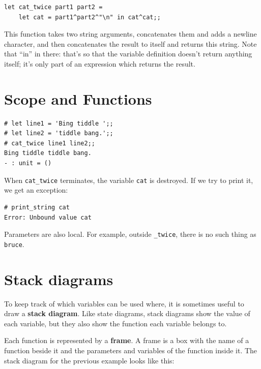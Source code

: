 \documentclass[10pt]{book}
\begin{document}

\beforeverb
\begin{verbatim}
let cat_twice part1 part2 = 
    let cat = part1^part2^"\n" in cat^cat;;
\end{verbatim}
\afterverb
This function takes two string arguments, concatenates them and adds a newline character, 
and then concatenates the result to itself and returns this string. Note that ``in'' in there: that's
so that the variable definition doesn't return anything itself; it's only part of an expression which
returns the result.

\section{Scope and Functions}


\beforeverb
\begin{verbatim}
# let line1 = 'Bing tiddle ';;
# let line2 = 'tiddle bang.';;
# cat_twice line1 line2;;
Bing tiddle tiddle bang.
- : unit = ()
\end{verbatim}
\afterverb

When \verb"cat_twice" terminates, the variable {\tt cat}
is destroyed.  If we try to print it, we get an exception:

\beforeverb
\begin{verbatim}
# print_string cat
Error: Unbound value cat
\end{verbatim}
\afterverb

Parameters are also local.
For example, outside \verb"_twice", there is no
such thing as {\tt bruce}.



\section{Stack diagrams}
\label{stackdiagram}
To keep track of which variables can be used where, it is sometimes 
useful to draw a {\bf stack diagram}.  Like state diagrams, stack 
diagrams show the value of each variable, but they also show the 
function each variable belongs to.


Each function is represented by a {\bf frame}.  A frame is a box
with the name of a function
beside it and the parameters and variables of the function inside it.
The stack diagram for the
previous example looks like this:
\end{document}
